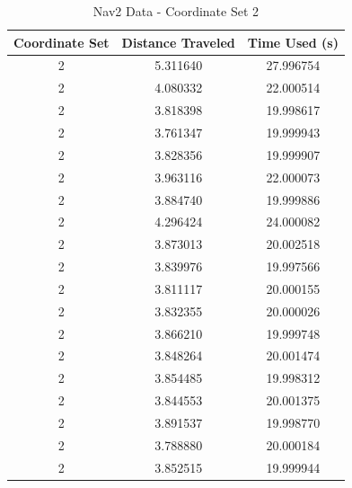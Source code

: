 \documentclass[%
paper=A4,               %
twoside=true,           %
openright,              %
11pt,                   %
bibliography=totoc,     %
titlepage=on,           %
DIV=12,                 %
BCOR=1.5cm,             %
parskip=half,            %
final
]{scrreprt}
\begin{document}
	
	\begin{table}[h!]
		\centering
		\begin{tabular}{|c|c|c|}
			\hline
			Coordinate Set & Distance Traveled & Time Used (s) \\
			\hline
			2 & 5.311640 & 27.996754 \\
			2 & 4.080332 & 22.000514 \\
			2 & 3.818398 & 19.998617 \\
			2 & 3.761347 & 19.999943 \\
			2 & 3.828356 & 19.999907 \\
			2 & 3.963116 & 22.000073 \\
			2 & 3.884740 & 19.999886 \\
			2 & 4.296424 & 24.000082 \\
			2 & 3.873013 & 20.002518 \\
			2 & 3.839976 & 19.997566 \\
			2 & 3.811117 & 20.000155 \\
			2 & 3.832355 & 20.000026 \\
			2 & 3.866210 & 19.999748 \\
			2 & 3.848264 & 20.001474 \\
			2 & 3.854485 & 19.998312 \\
			2 & 3.844553 & 20.001375 \\
			2 & 3.891537 & 19.998770 \\
			2 & 3.788880 & 20.000184 \\
			2 & 3.852515 & 19.999944 \\
			\hline
		\end{tabular}
		\caption{Nav2 Data - Coordinate Set 2}
		\label{tab:3}
	\end{table}
	
\end{document}
